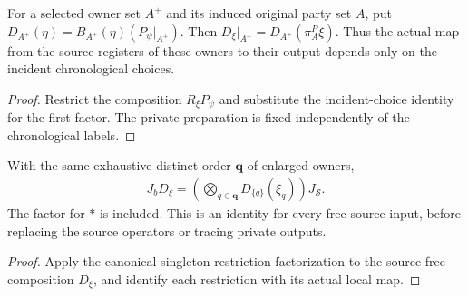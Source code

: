 \begin{definition}
    \label{def:peps_chrono_source_local_maps}
    \leanok
    For a selected owner set $A^+$ and its induced original party set $A$, put
    $D_{A^+}(\eta)=B_{A^+}(\eta)(P_\psi|_{A^+})$.
    Then $D_\xi|_{A^+}=D_{A^+}(\pi_A^P\xi)$.
    Thus the actual map from the source registers of these owners to their
    output depends only on the incident chronological choices.
\end{definition}

\begin{proof}
    \leanok
    Restrict the composition $R_\xi P_\psi$ and substitute the incident-choice
    identity for the first factor. The private preparation is fixed independently
    of the chronological labels.
\end{proof}

\begin{theorem}
    \label{thm:peps_chrono_source_factors}
    \leanok
    With the same exhaustive distinct order $\mathbf q$ of enlarged owners,
    \begin{align}
        J_b D_\xi=\left(\bigotimes_{q\in\mathbf q}D_{\{q\}}(\xi_q)\right)J_{\mathcal S}.
        \label{eq:peps_chrono_source_factors}
    \end{align}
    The factor for $\ast$ is included. This is an identity for every free source
    input, before replacing the source operators or tracing private outputs.
\end{theorem}

\begin{proof}
    \leanok
    Apply the canonical singleton-restriction factorization to the source-free
    composition $D_\xi$, and identify each restriction with its actual local map.
\end{proof}

